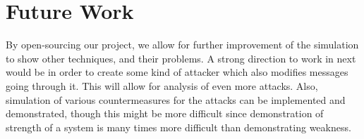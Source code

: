 \documentclass[12pt,a4paper]{article}
\begin{document}
\section{Future Work}
\label{sec:future}

By open-sourcing our project, we allow for further improvement of the simulation to show other techniques, and their problems. A strong direction to work in next would be in order to create some kind of attacker which also modifies messages going through it. This will allow for analysis of even more attacks. Also, simulation of various countermeasures for the attacks can be implemented and demonstrated, though this might be more difficult since demonstration of strength of a system is many times more difficult than demonstrating weakness.

\newpage



\end{document}
